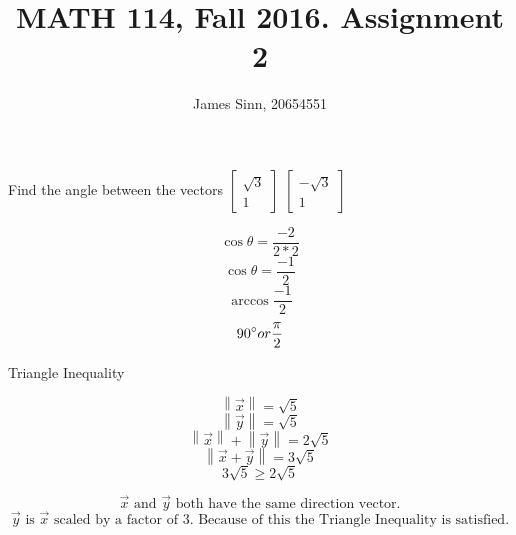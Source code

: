 \documentclass[12pt]{article}
\newcommand{\dbarl}{\left\lVert}
\newcommand{\dbarr}{\right\rVert}
\newenvironment{problem}[2][Problem]{\begin{trivlist}
\item[\hskip \labelsep {\bfseries #1}\hskip \labelsep {\bfseries #2.}]}{\end{trivlist}}
\begin{document}

\title{MATH 114, Fall 2016. Assignment 2}
\author{James Sinn, 20654551}
\maketitle

\begin{problem}{1}
	Find the angle between the vectors
\(\left[
\begin{matrix}
	\sqrt{3}\\
	1
\end{matrix}
\right]\)
\(\left[
\begin{matrix}
	-\sqrt{3}\\
	1
\end{matrix}
\right]\)
\end{problem}

	\[\cos\theta = \frac{-2}{2*2}\]
	\[\cos\theta = \frac {-1}{2}\]
	\[\arccos{\frac{-1}{2}}\]
	\[90\degree or \frac{\pi}{2}\]

\begin{problem}{2}
	Triangle Inequality
\end{problem}
	\[\dbarl\vec x\dbarr = \sqrt{5}\]
	\[\dbarl\vec y\dbarr = \sqrt{5}\]
	\[\dbarl\vec x\dbarr + \dbarl\vec y\dbarr = 2\sqrt{5}\]
	\[\dbarl\vec x + \vec y \dbarr = 3\sqrt{5}\]
	\[3\sqrt{5} \geq 2\sqrt{5}\]

	\[\vec x \text{ and } \vec y \text{ both have the same direction vector.}\]
	\[\vec y \text{ is } \vec x \text{ scaled by a factor of 3. Because of this the Triangle Inequality is satisfied.}\]
\end{document}
